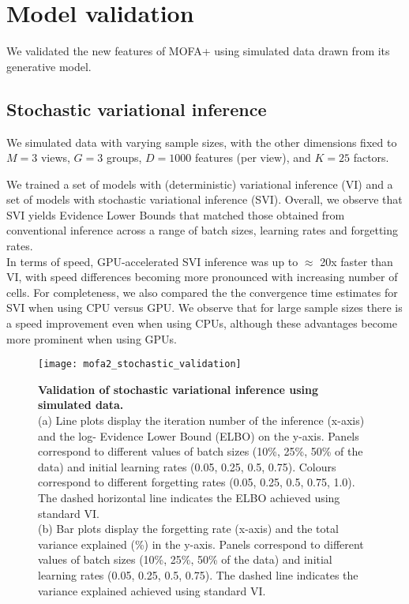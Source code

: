 \graphicspath{{Chapter4/Figs/simulations/}{Chapter4/Figs/scrna/}{Chapter4/Figs/scmet/}{Chapter4/Figs/scnmt/}}

\section{Model validation}

We validated the new features of MOFA+ using simulated data drawn from its generative model.

\subsection{Stochastic variational inference}

We simulated data with varying sample sizes, with the other dimensions fixed to $M=3$ views, $G=3$ groups, $D=1000$ features (per view), and $K=25$ factors.

We trained a set of models with (deterministic) variational inference (VI) and a set of models with stochastic variational inference (SVI). Overall, we observe that SVI yields Evidence Lower Bounds that matched those obtained from conventional inference across a range of batch sizes, learning rates and forgetting rates.\\
In terms of speed, GPU-accelerated SVI inference was up to $\approx$ 20x faster than VI, with speed differences becoming more pronounced with increasing number of cells. For completeness, we also compared the the convergence time estimates for SVI when using CPU versus GPU. We observe that for large sample sizes there is a speed improvement even when using CPUs, although these advantages become more prominent when using GPUs.

\begin{figure}[H]
	\centering
	\texttt{[image: mofa2\_stochastic\_validation]}
	\caption[]{
	\textbf{Validation of stochastic variational inference using simulated data.} \\
	(a) Line plots display the iteration number of the inference (x-axis) and the log- Evidence Lower Bound (ELBO) on the y-axis. Panels correspond to different values of batch sizes (10\%, 25\%, 50\% of the data) and initial learning rates (0.05, 0.25, 0.5, 0.75). Colours correspond to different forgetting rates (0.05, 0.25, 0.5, 0.75, 1.0). The dashed horizontal line indicates the ELBO achieved using standard VI. \\
	(b) Bar plots display the forgetting rate (x-axis) and the total variance explained (\%) in the y-axis. Panels correspond to different values of batch sizes (10\%, 25\%, 50\% of the data) and initial learning rates (0.05, 0.25, 0.5, 0.75). The dashed line indicates the variance explained achieved using standard VI. 
	}
	\label{fig:mofa2_stochastic_validation}
\end{figure}


